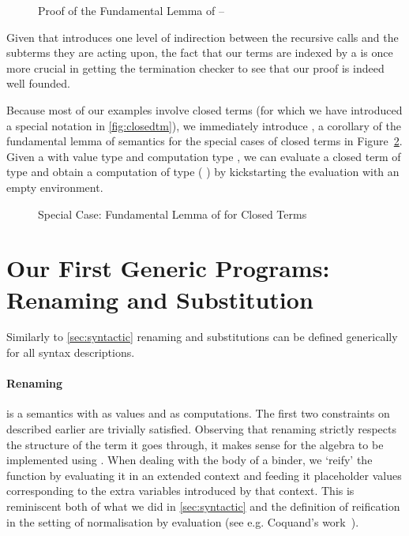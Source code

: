 \begin{figure}[h]
\caption{Proof of the Fundamental Lemma of  -- \label{fig:genbody}}
\end{figure}

Given that  introduces one level of indirection between the recursive
calls and the subterms they are acting upon, the fact that our terms are indexed
by a  is once more crucial in getting the termination checker to see
that our proof is indeed well founded.

Because most of our examples involve closed terms (for which we have
introduced a special notation in \cref{fig:closedtm}), we immediately
introduce , a corollary of the fundamental lemma of semantics
for the special cases of closed terms in Figure~\ref{fig:closedsem}.
Given a  with value type  and computation type ,
we can evaluate a closed term of type  and obtain a computation of
type {(  \AIC{[]})} by kickstarting the evaluation with an
empty environment.

\begin{figure}[h]
\caption{Special Case: Fundamental Lemma of  for Closed Terms\label{fig:closedsem}}
\end{figure}

\section{Our First Generic Programs: Renaming and Substitution}\label{section:renandsub}

Similarly to \cref{sec:syntactic} renaming and substitutions can be defined generically
for all syntax descriptions.

\paragraph{Renaming} is a semantics with  as values and  as computations.
The first two constraints on  described earlier are trivially satisfied. Observing
that renaming strictly respects the structure of the term it goes through, it makes
sense for the algebra to be implemented using . When dealing with the body
of a binder, we `reify' the  function by evaluating it in an extended
context and feeding it placeholder values corresponding to the extra variables
introduced by that context. This is reminiscent both of what we did in
\cref{sec:syntactic} and the definition of reification in the setting of normalisation
by evaluation (see e.g. Coquand's work~\citeyear{coquand2002formalised}).

